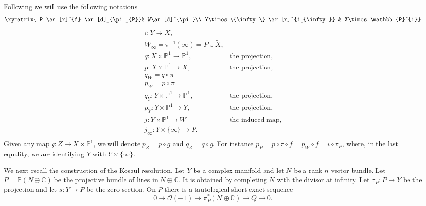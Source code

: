 \documentclass[10pt,twoside]{article}
\numberwithin{equation}{section}
\theoremstyle{plain}
\theoremstyle{definition}
\begin{document}
Following \cite{BismutGilletSoule:MR1086887} we will use the following notations
\begin{displaymath}
  \xymatrix{
  P \ar[r]^{f} \ar[d]_{\pi _{P}}& W\ar[d]^{\pi}\\
Y\times \{\infty\} \ar[r]^{i_{\infty}} & X\times \mathbb{P}^{1}}
\end{displaymath}
\begin{displaymath}
  \begin{array}{cr}
    i\colon Y\longrightarrow X,&\\
    W_{\infty}=\pi ^{-1}(\infty)=P\cup\widetilde X,&\\
    q\colon X\times \mathbb{P}^{1}\longrightarrow \mathbb{P}^{1},& \text{the
      projection,}\\
    p\colon X\times \mathbb{P}^{1}\longrightarrow X,& \text{the
      projection,}\\
    q_{W}=q \circ \pi &\\
    p_{W}=p \circ \pi &\\
    q_{Y}\colon Y\times \mathbb{P}^{1}\longrightarrow \mathbb{P}^{1},& \text{the
      projection,}\\
    p_{Y}\colon Y\times \mathbb{P}^{1}\longrightarrow Y,& \text{the
      projection,}\\
    j\colon Y\times \mathbb{P}^{1}\longrightarrow W& \text{the induced map,}\\ 
    j_{\infty}\colon  Y\times \{\infty\} \longrightarrow P. &\\
  \end{array}
\end{displaymath}
Given any map $g\colon Z\longrightarrow X\times \mathbb{P}^{1}$, we will
denote $p_{Z}=p\circ g$ and $q_{Z}=q\circ g$. For instance
$p_{P}=p\circ \pi\circ f=p_{W}\circ f=i\circ \pi _{P}$, where, in the
last equality, we are identifying $Y$ with $Y\times \{\infty\}$.

We next recall the construction of the Koszul resolution. Let $Y$ be a
complex manifold and let $N$ be a rank $n$ vector bundle. Let
$P=\mathbb{P}(N\oplus \mathbb{C})$ be the projective bundle of lines
in $N\oplus \mathbb{C}$. It is obtained by 
completing $N$ with the divisor at infinity. Let $\pi
_{P}\colon P\longrightarrow Y$ be the projection 
and let $s\colon Y\longrightarrow P$ be the zero section. On $P$ there
is a tautological short exact sequence 
\begin{equation}
  \label{eq:5}
  0\longrightarrow \mathcal{O}(-1) \longrightarrow 
  \pi _{P}^{\ast}(N\oplus \mathbb{C})\longrightarrow 
  Q\longrightarrow 0.
\end{equation}
\end{document}
